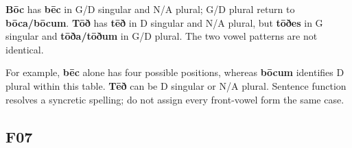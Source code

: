 \begin{minipage}{\linewidth}
\textbf{Bōc} has \textbf{bēc} in G/\allowbreak{}D singular and N/\allowbreak{}A plural; G/\allowbreak{}D plural return to \textbf{bōca/\allowbreak{}bōcum}. \textbf{Tōð} has \textbf{tēð} in D singular and N/\allowbreak{}A plural, but \textbf{tōðes} in G singular and \textbf{tōða/\allowbreak{}tōðum} in G/\allowbreak{}D plural. The two vowel patterns are not identical.

For example, \textbf{bēc} alone has four possible positions, whereas \textbf{bōcum} identifies D plural within this table. \textbf{Tēð} can be D singular or N/\allowbreak{}A plural. Sentence function resolves a syncretic spelling; do not assign every front-vowel form the same case.

\end{minipage}\par\addvspace{4pt}

\subsection*{F07}

